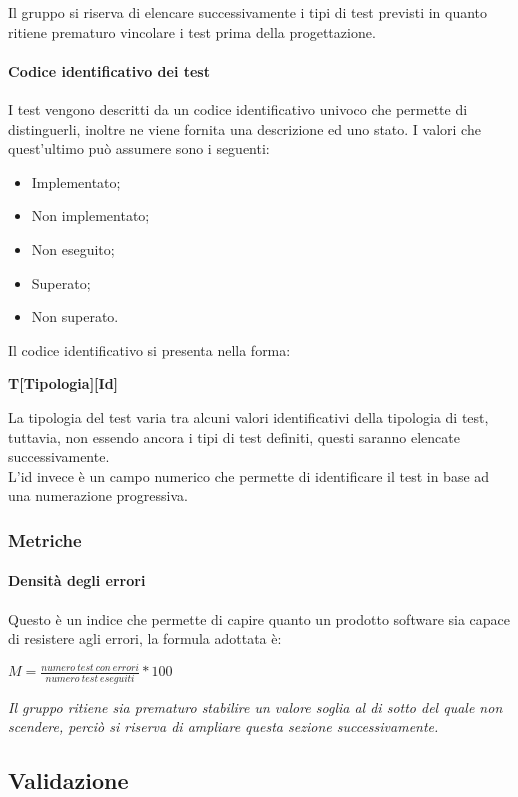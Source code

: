 Il gruppo si riserva di elencare successivamente i tipi di test previsti in quanto ritiene prematuro vincolare i test 
prima della progettazione.

\paragraph{Codice identificativo dei test}
I test vengono descritti da un codice identificativo univoco che permette di distinguerli, inoltre ne viene fornita una 
descrizione ed uno stato. I valori che quest'ultimo può assumere sono i seguenti:
\begin{itemize}
    \item Implementato;
    \item Non implementato;
    \item Non eseguito;
    \item Superato;
    \item Non superato.
\end{itemize}
Il codice identificativo si presenta nella forma:
\begin{center}
    \textbf{T[Tipologia][Id]}
\end{center}
La tipologia del test varia tra alcuni valori identificativi della tipologia di test, tuttavia, non essendo ancora i 
tipi di test definiti, questi saranno elencate successivamente.\\
L'id invece è un campo numerico che permette di identificare il test in base ad una numerazione progressiva.

\subsubsection{Metriche}

\paragraph{Densità degli errori}

Questo è un indice che permette di capire quanto un prodotto software sia capace di resistere agli errori, la formula 
adottata è:
\begin{center}
    \textbf{$M = \frac{numero\ test\ con\ errori}{numero\ test\ eseguiti} * 100$}
\end{center}
\emph{Il gruppo ritiene sia prematuro stabilire un valore soglia al di sotto del quale non scendere, perciò si riserva 
di ampliare questa sezione successivamente.}

\subsection{Validazione}

